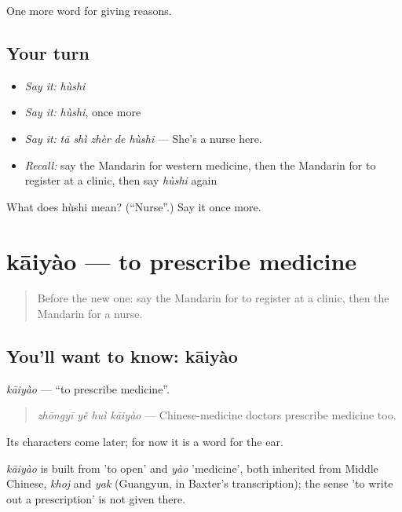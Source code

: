 \begin{grammarlens}[title={What you've built}]
One more word for giving reasons.
\end{grammarlens}

\subsection*{Your turn}
\begin{itemize}
\raggedright
  \item \emph{Say it:} \emph{hùshi}
  \item \emph{Say it:} \emph{hùshi}, once more
  \item \emph{Say it:} \emph{tā shì zhèr de hùshi} — She's a nurse here.
  \item \emph{Recall:} say the Mandarin for western medicine, then the Mandarin for to register at a clinic, then say \emph{hùshi} again
\end{itemize}

\begin{tcolorbox}[breakable,colback=teal!4,colframe=teal!35!black,title={Before you move on}]
What does hùshi mean? (\textquotedblleft{}Nurse\textquotedblright{}.) Say it once more.
\end{tcolorbox}
\section[kāiyào]{kāiyào — to prescribe medicine}

\label{lesson:ZH-C231-kaiyao}



\begin{quote}
Before the new one: say the Mandarin for to register at a clinic, then the Mandarin for a nurse.
\end{quote}

\subsection*{You'll want to know: kāiyào}
\emph{kāiyào} — \textquotedblleft{}to prescribe medicine\textquotedblright{}.

\begin{quote}
\emph{zhōngyī yě huì kāiyào} — Chinese-medicine doctors prescribe medicine too.
\end{quote}

Its characters come later; for now it is a word for the ear.

\begin{cousinweb}
\emph{kāiyào} is built from  'to open' and \emph{yào} 'medicine', both inherited from Middle Chinese, \emph{khoj} and \emph{yak} (Guangyun, in Baxter's transcription); the sense 'to write out a prescription' is not given there.
\end{cousinweb}


